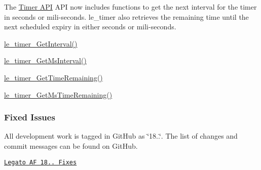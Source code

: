 The \hyperlink{c_timer}{Timer A\+PI} A\+PI now includes functions to get the next interval for the timer in seconds or mili-\/seconds. le\+\_\+timer also retrieves the remaining time until the next scheduled expiry in either seconds or mili-\/seconds.
\begin{DoxyItemize}
\item \hyperlink{le__timer_8h_a2036a01925bc85b3c477b45e6c3703aa}{le\+\_\+timer\+\_\+\+Get\+Interval()}
\item \hyperlink{le__timer_8h_aa9defca5b3334e1d002b2386b11ae72b}{le\+\_\+timer\+\_\+\+Get\+Ms\+Interval()}
\item \hyperlink{le__timer_8h_a0eeee8aaae982b43bc8b3cb46d1c6c9d}{le\+\_\+timer\+\_\+\+Get\+Time\+Remaining()}
\item \hyperlink{le__timer_8h_a08968a04f934e650b40ee496010ed6bb}{le\+\_\+timer\+\_\+\+Get\+Ms\+Time\+Remaining()}
\end{DoxyItemize}\hypertarget{releaseNotes18030_rn1803_Fixes}{}\subsubsection{Fixed Issues}\label{releaseNotes18030_rn1803_Fixes}
All development work is tagged in Git\+Hub as \char`\"{}18..\char`\"{}. The list of changes and commit messages can be found on Git\+Hub.


\begin{DoxyItemize}
\item \href{https://github.com/legatoproject/legato-af/commits/18.03.0}{\tt Legato AF 18.. Fixes}
\end{DoxyItemize}

